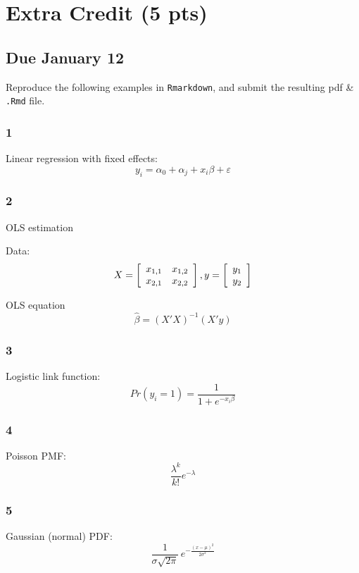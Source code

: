 \documentclass[]{article}
\begin{document}
\newpage

\section{Extra Credit (5 pts)}\label{extra-credit-5-pts}

\subsection{Due January 12}\label{due-january-12}

Reproduce the following examples in \texttt{Rmarkdown}, and submit the
resulting pdf \& \texttt{.Rmd} file.

\subsubsection{1}\label{section}

Linear regression with fixed effects:
\[ y_{i} = \alpha_{0} + \alpha_{j} + x_{i} \beta + \varepsilon \]

\subsubsection{2}\label{section-1}

OLS estimation

Data: \[
X = 
\left[
\begin{array}{cc}
x_{1, 1} & x_{1, 2} \\
x_{2, 1} & x_{2, 2} \\
\end{array}
\right],
\\
y = 
\left[
\begin{array}{cc}
y_{1}\\
y_{2}\\
\end{array}
\right]
\]

OLS equation \[
\hat{\beta} = (X'X)^{-1}(X'y)
\]

\subsubsection{3}\label{section-2}

Logistic link function:
\[ Pr(y_{i} = 1) = \frac{1}{1 + e^{-x_{i} \beta}} \]

\subsubsection{4}\label{section-3}

Poisson PMF: \[
      \frac{\lambda^k}{k!} e^{-\lambda}
\]

\subsubsection{5}\label{section-4}

Gaussian (normal) PDF:
\[ \frac{1}{\sigma\sqrt{2\pi}}\, e^{-\frac{(x - \mu)^2}{2 \sigma^2}} \]
\end{document}
